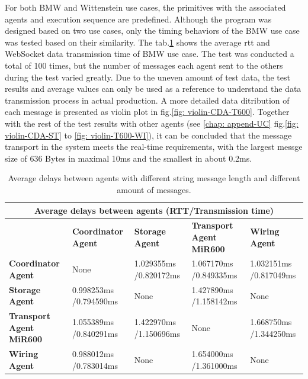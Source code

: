 For both BMW and Wittenstein use cases, the primitives with the associated agents and execution sequence are 
predefined. Although the program was designed based on two use cases, 
only the timing behaviors of the BMW use case was tested based on their similarity. 
The tab.\ref{tab: mean-usecase-time} shows the average \gls{rtt} and WebSocket 
data transmission time of BMW use case. The test was conducted a total of 100 times, 
but the number of messages 
each agent sent to the others during the test varied greatly. 
Due to the uneven amount of test data, 
the test results 
and average values can only be used as a reference to understand the data 
transmission process in actual production. A more detailed data ditribution of each 
message is presented as violin plot in fig.\ref{fig: violin-CDA-T600}. Together 
with the rest of the test results with other agents 
(see \ref{chap: append-UC} fig.\ref{fig: violin-CDA-ST} to \ref{fig: violin-T600-WI}), 
it can be concluded that 
the message transport in the system meets the real-time requirements, with the 
largest messge size of 636 Bytes in maximal 10ms and the smallest in about 0.2ms. 


\begin{table}[htbp]
    \small
    \centering
    \caption{Average delays between agents with different string message length and 
    different amount of messages.}
    \label{tab: mean-usecase-time}
    \begin{tabular}{|m{}|m{}|m{}|m{}|m{}|}
    \hline
    \multicolumn{5}{|c|}{\textbf{Average delays between agents (RTT/Transmission time)}}                                                            \\ \hline
    \textbf{}                         & \textbf{Coordinator Agent}             & \textbf{Storage Agent}        & \textbf{Transport Agent MiR600}    & \textbf{Wiring Agent}\\ \hline
    \textbf{Coordinator Agent}      & None                  & 1.029355ms /0.820172ms & 1.067170ms /0.849335ms  & 1.032151ms /0.817049ms \\ \hline
    \textbf{Storage Agent}          & 0.998253ms /0.794590ms & None                  & 1.427890ms /1.158142ms  & None                  \\ \hline
    \textbf{Transport Agent MiR600} & 1.055389ms /0.840291ms & 1.422970ms /1.150696ms & None                   & 1.668750ms /1.344250ms \\ \hline
    \textbf{Wiring Agent}           & 0.988012ms /0.783014ms & None                  & 1.654000ms /1.361000ms  & None                  \\ \hline
    \end{tabular}
\end{table}


